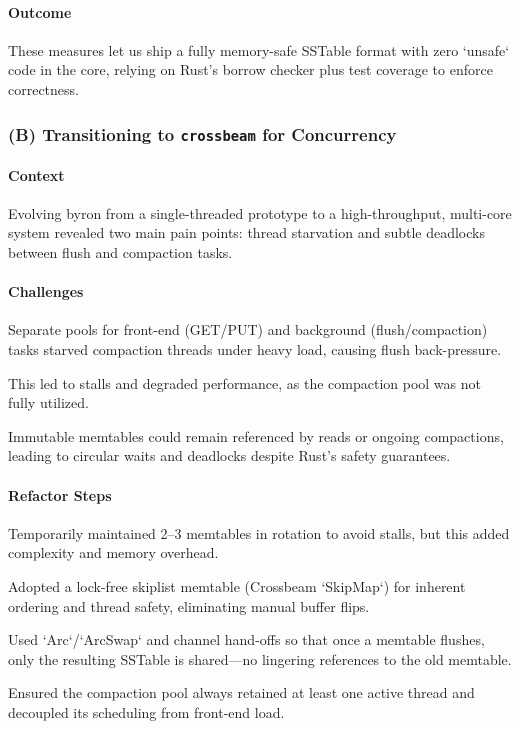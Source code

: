 \documentclass[10pt]{article}
\begin{document}
\paragraph{Outcome}  
These measures let us ship a fully memory-safe SSTable format with zero `unsafe` code in the core, relying on Rust’s borrow checker plus test coverage to enforce correctness.

\subsubsection*{(B) Transitioning to \texttt{crossbeam} for Concurrency}

\paragraph{Context}  
Evolving byron from a single-threaded prototype to a high-throughput, multi-core system revealed two main pain points: thread starvation and subtle deadlocks between flush and compaction tasks.

\paragraph{Challenges}
\begin{description}[leftmargin=1em,labelwidth=*,itemsep=0.5ex]
  \item[Thread Contention \& Starvation] Separate pools for front-end (GET/PUT) and background (flush/compaction) tasks starved compaction threads under heavy load, causing flush back-pressure. 
  \item[] This led to stalls and degraded performance, as the compaction pool was not fully utilized.
  \item[Deadlock in Flush/Compaction] Immutable memtables could remain referenced by reads or ongoing compactions, leading to circular waits and deadlocks despite Rust’s safety guarantees.
\end{description}

\paragraph{Refactor Steps}
\begin{description}[leftmargin=1em,labelwidth=*,itemsep=0.5ex]
  \item[Array of Memtables (Stop-Gap)] Temporarily maintained 2–3 memtables in rotation to avoid stalls, but this added complexity and memory overhead.
  \item[Migrate to Crossbeam SkipMap] Adopted a lock-free skiplist memtable (Crossbeam `SkipMap`) for inherent ordering and thread safety, eliminating manual buffer flips.
  \item[Clear Ownership Hand-Off] Used `Arc`/`ArcSwap` and channel hand-offs so that once a memtable flushes, only the resulting SSTable is shared—no lingering references to the old memtable.
  \item[Fine-Grained Scheduling] Ensured the compaction pool always retained at least one active thread and decoupled its scheduling from front-end load.
\end{description}
\end{document}
